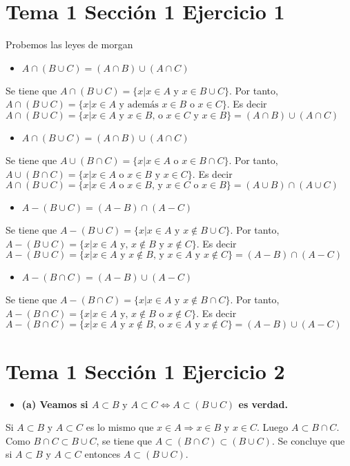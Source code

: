 \documentclass{article}
\begin{document}
\section{Tema 1 Sección 1 Ejercicio 1}
Probemos las leyes de morgan
\begin{itemize}
\item $A\cap(B\cup C)=(A\cap B)\cup (A\cap C)$
\end{itemize}
Se tiene que $A\cap(B\cup C)=\{x|x\in A \text{ y } x\in B\cup C\}$. Por tanto, $A\cap(B\cup C)=\{x|x\in A \text{ y además }  x\in B \text{ o }x\in C\}$. Es decir $A\cap(B\cup C)=\{x|x\in A \text{ y }  x\in B \text{, o }x\in C\text{ y }  x\in B\}=(A\cap B)\cup (A\cap C)$
\begin{itemize}
\item $A\cap(B\cup C)=(A\cap B)\cup (A\cap C)$
\end{itemize}
Se tiene que $A\cup(B\cap C)=\{x|x\in A \text{ o } x\in B\cap C\}$. Por tanto, $A\cup(B\cap C)=\{x|x\in A \text{ o }  x\in B \text{ y }x\in C\}$. Es decir $A\cap(B\cup C)=\{x|x\in A \text{ o }  x\in B \text{, y }x\in C\text{ o }  x\in B\}=(A\cup B)\cap (A\cup C)$
\begin{itemize}
\item $A-(B\cup C)=(A-B)\cap (A-C)$
\end{itemize}
Se tiene que $A-(B\cup C)=\{x|x\in A \text{ y } x\notin B\cup C\}$. Por tanto, $A-(B\cup C)=\{x|x\in A \text{ y, }  x\notin B \text{ y }x\notin C\}$. Es decir $A-(B\cup C)=\{x|x\in A \text{ y }  x\notin B \text{, y }x\in A\text{ y }  x\notin C\}=(A-B)\cap (A-C)$
\begin{itemize}
\item $A-(B\cap C)=(A-B)\cup (A-C)$
\end{itemize}
Se tiene que $A-(B\cap C)=\{x|x\in A \text{ y } x\notin B\cap C\}$. Por tanto, $A-(B\cap C)=\{x|x\in A \text{ y, }  x\notin B \text{ o }x\notin C\}$. Es decir $A-(B\cap C)=\{x|x\in A \text{ y }  x\notin B \text{, o }x\in A\text{ y }  x\notin C\}=(A-B)\cup (A-C)$
\section{Tema 1 Sección 1 Ejercicio 2}
\begin{itemize}
\item \bf (a) \rm Veamos si  $A\subset B\text{ y }A\subset C \iff A\subset(B\cup C)$ es verdad.
\end{itemize}
Si $A\subset B$ y $A\subset C$ es lo mismo que $ x\in A\Rightarrow x\in B \text{ y } x\in C$. Luego $A\subset B\cap C$. Como $B\cap C \subset B\cup C$, se tiene que $A\subset( B\cap C) \subset (B\cup C)$. Se concluye que si $A\subset B$ y $A\subset C$ entonces $A\subset (B\cup C)$.
\end{document}
